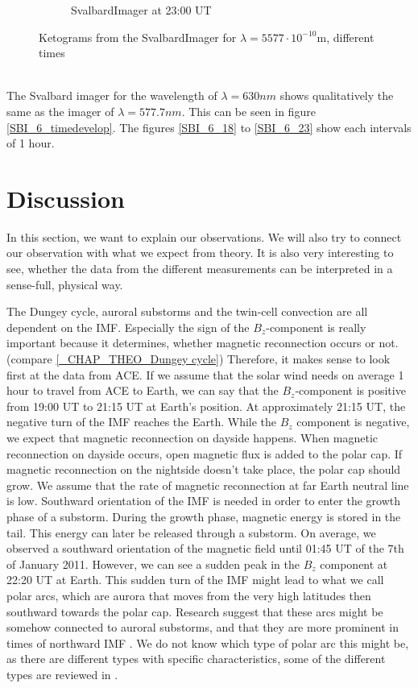 \documentclass[10pt,a4paper]{article}
\begin{document}
\begin{figure}[h]
\begin{subfigure}{0.3\textwidth}
	\caption{ SvalbardImager at 23:00 UT \label{SBI_5_23}}
\end{subfigure}
\caption{Ketograms from the SvalbardImager for $\lambda=5577 \cdot 10^{-10} \mathrm{m}$, different times }
\label{SBI_5_timedevelop}
\end{figure}
\\
The Svalbard imager for the wavelength of $\lambda=630 nm$ shows qualitatively the same as the imager of $\lambda=577.7 nm$.  This can be seen in figure \ref{SBI_6_timedevelop}. The figures \ref{SBI_6_18} to \ref{SBI_6_23} show each intervals of 1 hour. 
\clearpage


\section{Discussion \label{discussion}}

In this section, we want to explain our observations. We will also try to connect our observation with what we expect from theory. 
It is also very interesting to see, whether the data from the different measurements can be interpreted in a sense-full, physical way.

The Dungey cycle, auroral substorms and the twin-cell convection are all dependent on the IMF. Especially the sign of the $B_z$-component is really important because it determines, whether magnetic reconnection occurs or not. (compare \ref{_CHAP_THEO_Dungey cycle}) Therefore, it makes sense to look first at the data from ACE. 
If we assume that the solar wind needs on average 1 hour to travel from ACE to Earth, we can say that the $B_z$-component is positive from 19:00 UT to 21:15 UT at Earth's position. At approximately 21:15 UT, the negative turn of the IMF reaches the Earth. While the $B_z$ component is negative, we expect that magnetic reconnection on dayside happens. When magnetic reconnection on dayside occurs, open magnetic flux is added to the polar cap. If magnetic reconnection on the nightside doesn't take place, the polar cap should grow. We assume that the rate of magnetic reconnection at far Earth neutral line is low. 
Southward orientation of the IMF is needed in order to enter the growth phase of a substorm. During the growth phase, magnetic energy is stored in the tail. This energy can later be released through a substorm. On average, we observed a southward orientation of the magnetic field until 01:45 UT of the 7th of January 2011. However, we can see a sudden peak in the $B_z$ component at 22:20 UT at Earth. This sudden turn of the IMF might lead to what we call polar arcs, which are aurora that moves from the very high latitudes then southward towards the polar cap. Research suggest that these arcs might be somehow connected to auroral substorms, and that they are more prominent in times of northward IMF \cite{paper3}. We do not know which type of polar arc this might be, as there are different types with specific characteristics, some of the different types are reviewed in \cite{paper4}. 
\end{document}
